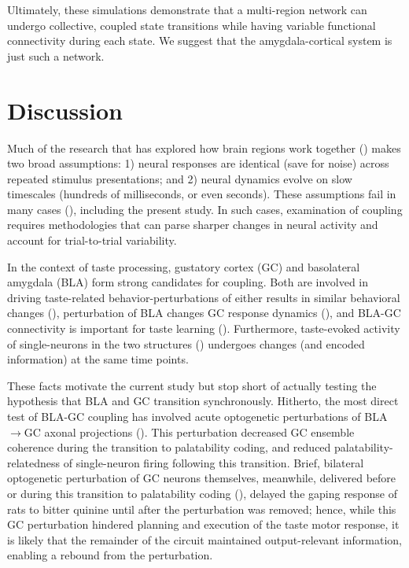 \begin{refsection}
Ultimately, these simulations demonstrate that a multi-region network can undergo collective, coupled state transitions while having variable functional connectivity during each state. We suggest that the amygdala-cortical system is just such a network.

\section{Discussion}
Much of the research that has explored how brain regions work together (\cite{markov2014a,grabska-barwi2017a,yates2017a,glaser2018a}) makes two broad assumptions: 1) neural responses are identical (save for noise) across repeated stimulus presentations; and 2) neural dynamics evolve on slow timescales (hundreds of milliseconds, or even seconds). These assumptions fail in many cases (\cite{gat1997a,sugase1999a,latimer2015a,jones2007a}), including the present study. In such cases, examination of coupling requires methodologies that can parse sharper changes in neural activity and account for trial-to-trial variability.

In the context of taste processing, gustatory cortex (GC) and basolateral amygdala (BLA) form strong candidates for coupling. Both are involved in driving taste-related behavior-perturbations of either results in similar behavioral changes (\cite{lovaglio2010a,lin2011a,lin2018a}), perturbation of BLA changes GC response dynamics (\cite{piette2012a}), and BLA-GC connectivity is important for taste learning (\cite{lin2012a}). Furthermore, taste-evoked activity of single-neurons in the two structures (\cite{fontanini2009a,sadacca2012a}) undergoes changes (and encoded information) at the same time points. 

These facts motivate the current study but stop short of actually testing the hypothesis that BLA and GC transition synchronously. Hitherto, the most direct test of BLA-GC coupling has involved acute optogenetic perturbations of BLA$\rightarrow$GC axonal projections (\cite{lin2021a}). This perturbation decreased GC ensemble coherence during the transition to palatability coding, and reduced palatability-relatedness of single-neuron firing following this transition. Brief, bilateral optogenetic perturbation of GC neurons themselves, meanwhile, delivered before or during this transition to palatability coding (\cite{mukherjee2019a}), delayed the gaping response of rats to bitter quinine until after the perturbation was removed; hence, while this GC perturbation hindered planning and execution of the taste motor response, it is likely that the remainder of the circuit maintained output-relevant information, enabling a rebound from the perturbation. 


\end{refsection}
